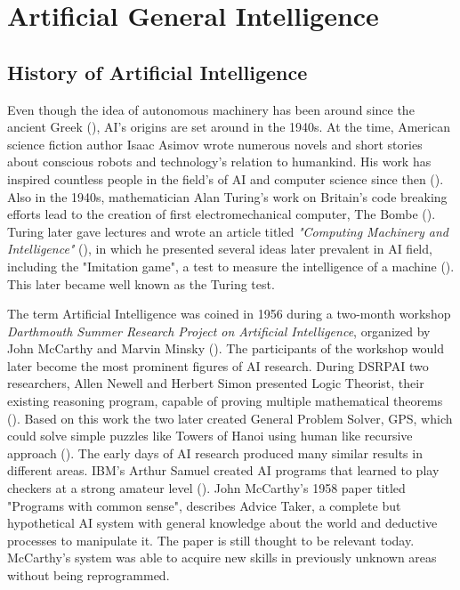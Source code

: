 \documentclass[utf8,english]{gradu3}
\begin{document}
\chapter{Artificial General Intelligence} 

\section{History of Artificial Intelligence} 

Even though the idea of autonomous machinery has been around since the ancient Greek (\cite{}), AI's origins are set around in the 1940s. At the time, American science fiction author Isaac Asimov wrote numerous novels and short stories about conscious robots and technology's relation to humankind. His work has inspired countless people in the field's of AI and computer science since then (\cite{kaplan2019}).
Also in the 1940s, mathematician Alan Turing's work on Britain's code breaking efforts lead to the creation of first electromechanical computer, The Bombe (\cite{kaplan2019}). Turing later gave lectures and wrote an article titled \emph{"Computing Machinery and Intelligence"} (\cite*{turing1950}), in which he presented several ideas later prevalent in AI field, including the "Imitation game", a test to measure the intelligence of a machine (\cite{norvig2002}). This later became well known as the Turing test.

The term Artificial Intelligence was coined in 1956 during a two-month workshop \emph{Darthmouth Summer Research Project on Artificial Intelligence}, organized by John McCarthy and Marvin Minsky (\cite{kaplan2019}). The participants of the workshop would later become the most prominent figures of AI research. During DSRPAI two researchers, Allen Newell and Herbert Simon presented Logic Theorist, their existing reasoning program, capable of proving multiple mathematical theorems (\cite{norvig2002}). Based on this work the two later created General Problem Solver, GPS, which could solve simple puzzles like Towers of Hanoi using human like recursive approach (\cite{newell1959}). The early days of AI research produced many similar results in different areas. IBM's Arthur Samuel created AI programs that learned to play checkers at a strong amateur level (\cite{norvig2002}).
John McCarthy's 1958 paper titled "Programs with common sense", describes Advice Taker, a complete but hypothetical AI system with general knowledge about the world and deductive processes to manipulate it. The paper is still thought to be relevant today. McCarthy's system was able to acquire new skills in previously unknown areas without being reprogrammed.
\end{document}
